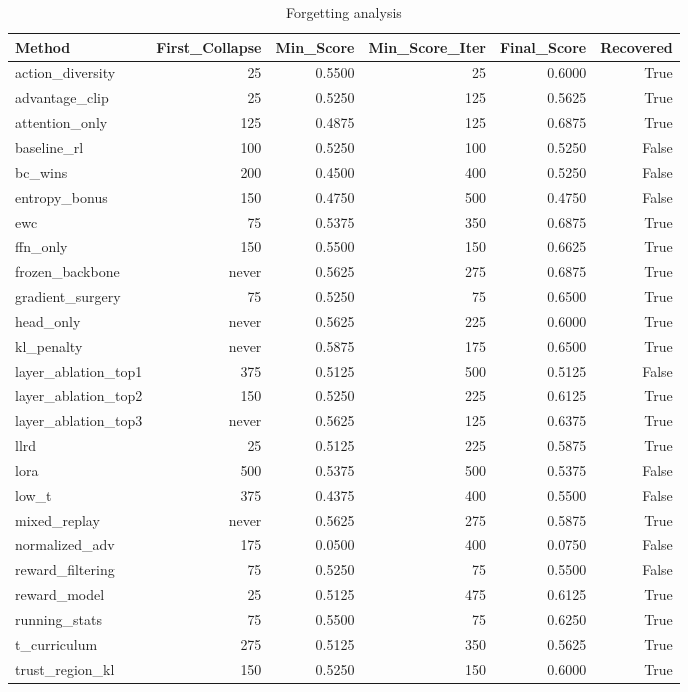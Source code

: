 \begin{table}[htbp]
\centering
\caption{Forgetting analysis}
\label{tab:forgetting}
\begin{tabular}{lrrrrr}
\toprule
\textbf{Method} & \textbf{First\_Collapse} & \textbf{Min\_Score} & \textbf{Min\_Score\_Iter} & \textbf{Final\_Score} & \textbf{Recovered} \\
\midrule
action\_diversity & 25 & 0.5500 & 25 & 0.6000 & True \\
advantage\_clip & 25 & 0.5250 & 125 & 0.5625 & True \\
attention\_only & 125 & 0.4875 & 125 & 0.6875 & True \\
baseline\_rl & 100 & 0.5250 & 100 & 0.5250 & False \\
bc\_wins & 200 & 0.4500 & 400 & 0.5250 & False \\
entropy\_bonus & 150 & 0.4750 & 500 & 0.4750 & False \\
ewc & 75 & 0.5375 & 350 & 0.6875 & True \\
ffn\_only & 150 & 0.5500 & 150 & 0.6625 & True \\
frozen\_backbone & never & 0.5625 & 275 & 0.6875 & True \\
gradient\_surgery & 75 & 0.5250 & 75 & 0.6500 & True \\
head\_only & never & 0.5625 & 225 & 0.6000 & True \\
kl\_penalty & never & 0.5875 & 175 & 0.6500 & True \\
layer\_ablation\_top1 & 375 & 0.5125 & 500 & 0.5125 & False \\
layer\_ablation\_top2 & 150 & 0.5250 & 225 & 0.6125 & True \\
layer\_ablation\_top3 & never & 0.5625 & 125 & 0.6375 & True \\
llrd & 25 & 0.5125 & 225 & 0.5875 & True \\
lora & 500 & 0.5375 & 500 & 0.5375 & False \\
low\_t & 375 & 0.4375 & 400 & 0.5500 & False \\
mixed\_replay & never & 0.5625 & 275 & 0.5875 & True \\
normalized\_adv & 175 & 0.0500 & 400 & 0.0750 & False \\
reward\_filtering & 75 & 0.5250 & 75 & 0.5500 & False \\
reward\_model & 25 & 0.5125 & 475 & 0.6125 & True \\
running\_stats & 75 & 0.5500 & 75 & 0.6250 & True \\
t\_curriculum & 275 & 0.5125 & 350 & 0.5625 & True \\
trust\_region\_kl & 150 & 0.5250 & 150 & 0.6000 & True \\
\bottomrule
\end{tabular}
\end{table}